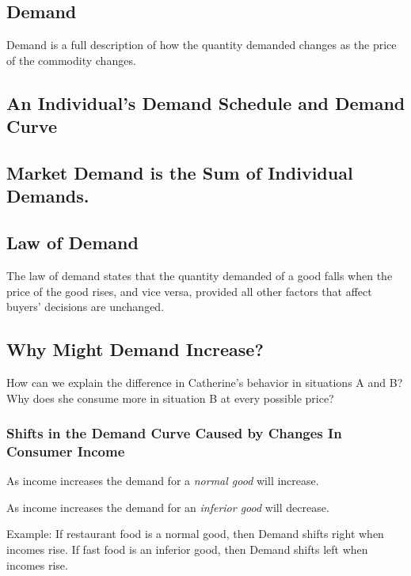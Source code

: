 \documentclass[
  letterpaper,
]{book}
\begin{document}
\subsection{Demand}\label{demand-1}

Demand is a full description of how the quantity demanded changes as the
price of the commodity changes.

\subsection{An Individual's Demand Schedule and Demand
Curve}\label{an-individuals-demand-schedule-and-demand-curve}

\subsection{Market Demand is the Sum of Individual
Demands.}\label{market-demand-is-the-sum-of-individual-demands.}

\subsection{Law of Demand}\label{law-of-demand}

The law of demand states that the quantity demanded of a good falls when
the price of the good rises, and vice versa, provided all other factors
that affect buyers' decisions are unchanged.

\subsection{Why Might Demand Increase?}\label{why-might-demand-increase}

How can we explain the difference in Catherine's behavior in situations
A and B? Why does she consume more in situation B at every possible
price?

\subsubsection{Shifts in the Demand Curve Caused by Changes In Consumer
Income}\label{shifts-in-the-demand-curve-caused-by-changes-in-consumer-income}

As income increases the demand for a \emph{normal good} will increase.

As income increases the demand for an \emph{inferior good} will
decrease.

Example: If restaurant food is a normal good, then Demand shifts right
when incomes rise. If fast food is an inferior good, then Demand shifts
left when incomes rise.
\end{document}
